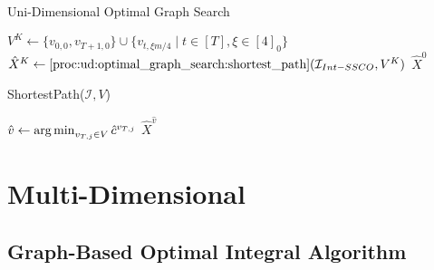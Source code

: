 \begin{algorithm}
    \caption{Uni-Dimensional Optimal Graph Search \cite{Albers2018}}\label{alg:ud:optimal_graph_search}
    $V^K \gets \{v_{0,0}, v_{T+1,0}\} \cup \{v_{t,\xi m / 4} \mid t \in [T], \xi \in [4]_0\}$\;
    $\hat{X}^K \gets \text{\ref{proc:ud:optimal_graph_search:shortest_path}}(\mathcal{I}_{Int-SSCO}, V^K)$\;
    \Return $\hat{X}^0$\;
\end{algorithm}

\begin{function}
	\caption{ShortestPath($\mathcal{I}, V$)}\label{proc:ud:optimal_graph_search:shortest_path}
    $\hat{v} \gets \operatorname*{arg\,min}_{v_{T,j} \in V} \hat{c}^{v_{T,j}}$\;
	\Return $\hat{X}^{\hat{v}}$\;
\end{function}

\section{Multi-Dimensional}

\subsection{Graph-Based Optimal Integral Algorithm}


